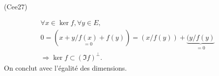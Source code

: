 \begin{tiny}(Cee27)\end{tiny}
\begin{multline*}
 \forall x \in \ker f, \forall y \in E,\;\\
 0 = (x + y / \underset{=0}{f(x)} + f(y) ) 
 = (x / f(y)) + \underset{ = 0}{\underbrace{(y / f(y)}} \\
 \Rightarrow \ker f \subset (\Im f)^{\bot}.
\end{multline*}
On conclut avec l'égalité des dimensions.